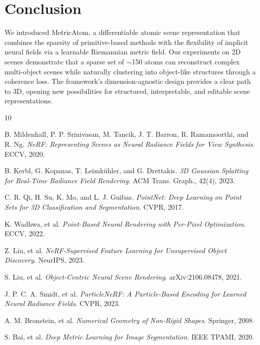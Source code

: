 \documentclass[11pt]{article}
\begin{document}
\section{Conclusion}

We introduced MetricAtom, a differentiable atomic scene representation that combines the sparsity of primitive-based methods with the flexibility of implicit neural fields via a learnable Riemannian metric field. Our experiments on 2D scenes demonstrate that a sparse set of $\sim$150 atoms can reconstruct complex multi-object scenes while naturally clustering into object-like structures through a coherence loss. The framework's dimension-agnostic design provides a clear path to 3D, opening new possibilities for structured, interpretable, and editable scene representations.


\begin{thebibliography}{10}

B. Mildenhall, P. P. Srinivasan, M. Tancik, J. T. Barron, R. Ramamoorthi, and R. Ng.
\textit{NeRF: Representing Scenes as Neural Radiance Fields for View Synthesis}.
ECCV, 2020.

B. Kerbl, G. Kopanas, T. Leimk\"{u}hler, and G. Drettakis.
\textit{3D Gaussian Splatting for Real-Time Radiance Field Rendering}.
ACM Trans. Graph., 42(4), 2023.

C. R. Qi, H. Su, K. Mo, and L. J. Guibas.
\textit{PointNet: Deep Learning on Point Sets for 3D Classification and Segmentation}.
CVPR, 2017.

K. Wadhwa, et al.
\textit{Point-Based Neural Rendering with Per-Pixel Optimization}.
ECCV, 2022.

Z. Liu, et al.
\textit{NeRF-Supervised Feature Learning for Unsupervised Object Discovery}.
NeurIPS, 2023.

S. Liu, et al.
\textit{Object-Centric Neural Scene Rendering}.
arXiv:2106.08478, 2021.

J. P. C. A. Smidt, et al.
\textit{ParticleNeRF: A Particle-Based Encoding for Learned Neural Radiance Fields}.
CVPR, 2023.

A. M. Bronstein, et al.
\textit{Numerical Geometry of Non-Rigid Shapes}.
Springer, 2008.

S. Bai, et al.
\textit{Deep Metric Learning for Image Segmentation}.
IEEE TPAMI, 2020.

\end{thebibliography}
\end{document}

